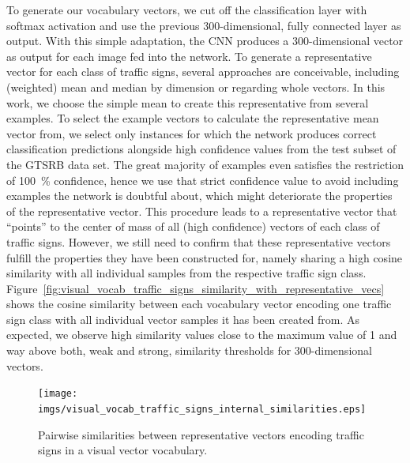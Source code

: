 To generate our vocabulary vectors, we cut off the classification layer with softmax activation and use the previous \num{300}-dimensional, fully connected layer as output.
With this simple adaptation, the \ac{CNN} produces a \num{300}-dimensional vector as output for each image fed into the network. 
To generate a representative vector for each class of traffic signs, several approaches are conceivable, including (weighted) mean and median by dimension or regarding whole vectors.
In this work, we choose the simple mean to create this representative from several examples.
To select the example vectors to calculate the representative mean vector from, we select only instances for which the network produces correct classification predictions alongside high confidence values from the test subset of the \ac{GTSRB} data set.
The great majority of examples even satisfies the restriction of \SI{100}{\percent} confidence, hence we use that strict confidence value to avoid including examples the network is doubtful about, which might deteriorate the properties of the representative vector. 
This procedure leads to a representative vector that \enquote{points} to the center of mass of all (high confidence) vectors of each class of traffic signs.
However, we still need to confirm that these representative vectors fulfill the properties they have been constructed for, namely sharing a high cosine similarity with all individual samples from the respective traffic sign class.
Figure~\ref{fig:visual_vocab_traffic_signs_similarity_with_representative_vecs} shows the cosine similarity between each vocabulary vector encoding one traffic sign class with all individual vector samples it has been created from.
As expected, we observe high similarity values close to the maximum value of \num{1} and way above both, weak and strong, similarity thresholds for \num{300}-dimensional vectors.

\begin{figure}[t]
    \centering
    \texttt{[image: imgs/visual\_vocab\_traffic\_signs\_internal\_similarities.eps]}
    \caption{Pairwise similarities between representative vectors encoding traffic signs in a visual vector vocabulary.}
    \label{fig:visual_vocab_traffic_signs_internal_similarities}
    \vspace{-0.5cm}
\end{figure}

